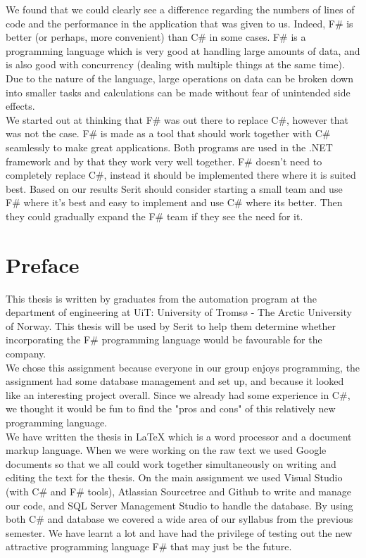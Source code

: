 \documentclass[12pt, a4paper]{article}
\begin{document}
We found that we could clearly see a difference regarding the numbers of lines of code and the performance in the application that was given to us. Indeed, F\# is better (or perhaps, more convenient) than C\# in some cases. F\# is a programming language which is very good at handling large amounts of data, and is also good with concurrency (dealing with multiple things at the same time). Due to the nature of the language, large operations on data can be broken down into smaller tasks and calculations can be made without fear of unintended side effects.\\

We started out at thinking that F\# was out there to replace C\#, however that was not the case. F\# is made as a tool that should work together with C\# seamlessly to make great applications. Both programs are used in the .NET framework and by that they work very well together. F\# doesn't need to completely replace C\#, instead it should be implemented there where it is suited best. Based on our results Serit should consider starting a small team and use F\# where it’s best and easy to implement and use C\# where its better. Then they could gradually expand the F\# team if they see the need for it.

\newpage
\section*{Preface}
This thesis is written by graduates from the automation program at the department of engineering  at UiT: University of Tromsø - The Arctic University of Norway. This thesis will be used by Serit to help them determine whether incorporating the F\# programming language would be favourable for the company.\\

We chose this assignment because everyone in our group enjoys programming, the assignment had some database management and set up, and because it looked like an interesting project overall. Since we already had some experience in C\#, we thought it would be fun to find the "pros and cons" of this relatively new programming language.\\

We have written the thesis in LaTeX which is a word processor and a document markup language. When we were working on the raw text we used Google documents so that we all could work together simultaneously on writing and editing the text for the thesis. On the main assignment we used Visual Studio (with C\# and F\# tools), Atlassian Sourcetree and Github to write and manage our code, and SQL Server Management Studio to handle the database. By using both C\# and database we covered a wide area of our syllabus from the previous semester. We have learnt a lot and have had the privilege of testing out the new attractive programming language F\# that may just be the future. \\
\end{document}
